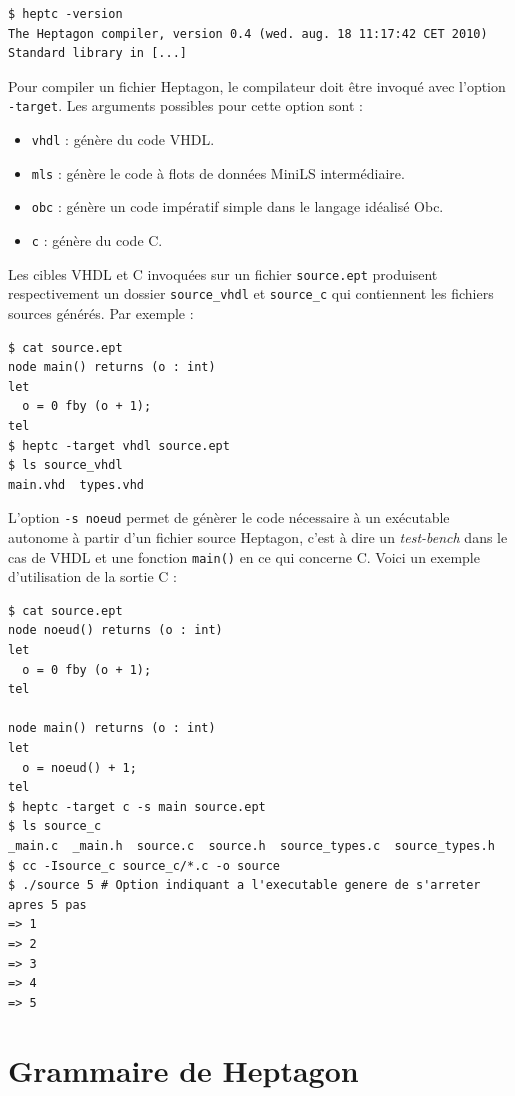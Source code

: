 \documentclass[a4paper]{article}
\newcommand{\LANG}{Heptagon}
\begin{document}
\begin{verbatim}
$ heptc -version
The Heptagon compiler, version 0.4 (wed. aug. 18 11:17:42 CET 2010)
Standard library in [...]
\end{verbatim}

Pour compiler un fichier \LANG, le compilateur doit \^etre invoqu\'e avec l'option
\verb/-target/. Les arguments possibles pour cette option sont :

\begin{itemize}
\item \verb/vhdl/ : g\'en\`ere du code VHDL.
\item \verb/mls/ : g\'en\`ere le code \`a flots de donn\'ees MiniLS interm\'ediaire.
\item \verb/obc/ : g\'en\`ere un code imp\'eratif simple dans le langage id\'ealis\'e Obc.
\item \verb/c/ : g\'en\`ere du code C.
\end{itemize}

Les cibles VHDL et C invoqu\'ees sur un fichier \verb/source.ept/ produisent
respectivement un dossier \verb/source_vhdl/ et \verb/source_c/ qui contiennent
les fichiers sources g\'en\'er\'es. Par exemple :

\begin{verbatim}
$ cat source.ept
node main() returns (o : int)
let
  o = 0 fby (o + 1);
tel
$ heptc -target vhdl source.ept
$ ls source_vhdl
main.vhd  types.vhd
\end{verbatim}

L'option \verb/-s noeud/ permet de g\'en\`erer le code n\'ecessaire \`a un
ex\'ecutable autonome \`a partir d'un fichier source \LANG, c'est \`a dire un
\textit{test-bench} dans le cas de VHDL et une fonction \verb/main()/ en ce qui
concerne C. Voici un exemple d'utilisation de la sortie C :

\begin{verbatim}
$ cat source.ept
node noeud() returns (o : int)
let
  o = 0 fby (o + 1);
tel

node main() returns (o : int)
let
  o = noeud() + 1;
tel
$ heptc -target c -s main source.ept
$ ls source_c
_main.c  _main.h  source.c  source.h  source_types.c  source_types.h
$ cc -Isource_c source_c/*.c -o source
$ ./source 5 # Option indiquant a l'executable genere de s'arreter apres 5 pas
=> 1
=> 2
=> 3
=> 4
=> 5
\end{verbatim}

\section{Grammaire de \LANG}
\end{document}
